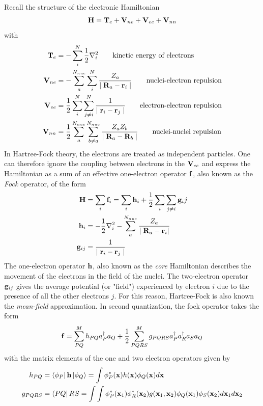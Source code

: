 Recall the structure of the electronic Hamiltonian
\begin{equation}
\mathbf{H} = \mathbf{T}_e + \mathbf{V}_{ne} + \mathbf{V}_{ee} + \mathbf{V}_{nn}
\end{equation}
\noindent with
\begin{align}
\mathbf{T}_e &= -\sum_i^N \frac{1}{2} \nabla_i^2 \qquad \textrm{kinetic energy of electrons} \\
\mathbf{V}_{ne} &= -\sum_a^{N_{nuc}} \sum_i^N \frac{Z_a}{\mid\mathbf{R}_a - \mathbf{r}_i\mid} \qquad \textrm{nuclei-electron repulsion} \\
\mathbf{V}_{ee} &= \frac{1}{2} \sum^N_i \sum^N_{j \neq i} \frac{1}{\mid \mathbf{r}_i - \mathbf{r}_j\mid} \qquad \textrm{electron-electron repulsion} \\
\mathbf{V}_{nn} &= \frac{1}{2}\sum_a^{N_{nuc}} \sum_{b \neq a}^{N_{nuc}} \frac{Z_a Z_b}{\mid \mathbf{R}_a - \mathbf{R}_b \mid} \qquad \textrm{nuclei-nuclei repulsion} 
\end{align}
\noindent In Hartree-Fock theory, the electrons are treated as independent particles. One can therefore ignore the coupling between electrons in the $\mathbf{V}_{ee}$ and express the Hamiltonian as a sum of an effective one-electron operator $\mathbf{f}$, also known as the \emph{Fock} operator, of the form
\begin{align}
\mathbf{H} &= \sum_i \mathbf{f}_i =  \sum_i \mathbf{h}_i + \frac{1}{2} \sum_i \sum_{j \neq i} \mathbf{g}_ij  \\
\mathbf{h}_i &= -\frac{1}{2}\nabla_i^2 - \sum_a^{N_{nuc}} \frac{Z_a}{\mid \mathbf{R}_a - \mathbf{r}_i |} \\
\mathbf{g}_{ij} &= \frac{1}{\mid \mathbf{r}_i - \mathbf{r}_j \mid}
\end{align}
\noindent The one-electron operator $\mathbf{h}$, also known as the \emph{core} Hamiltonian describes the movement of the electrons in the field of the nuclei. The two-electron operator $\mathbf{g}_{ij}$ gives the average potential (or "field") experienced by electron $i$ due to the presence of all the other electrons $j$. For this reason, Hartree-Fock is also known the \emph{mean-field} approximation. In second quantization, the fock operator takes the form
\begin{equation}
\mathbf{f} = \sum^{M}_{PQ} h_{PQ} a^{\dagger}_P a_Q + \frac{1}{2} \sum^{M}_{PQRS} g_{PQRS} a^{\dagger}_P a^{\dagger}_R a_S a_Q
\label{eq:FOCK2Q}
\end{equation}
\noindent with the matrix elements of the one and two electron operators given by
\begin{align}
h_{PQ} &= \bra{\phi_P} \mathbf{h} \ket{\phi_Q} = \int \phi_P^*(\mathbf{x}) h(\mathbf{x}) \phi_Q(\mathbf{x}) d\mathbf{x} \\
g_{PQRS} &= \bra{PQ}{RS} = \int\int \phi_P^*(\mathbf{x}_1) \phi^*_R(\mathbf{x}_2) g(\mathbf{x}_1,\mathbf{x}_2) \phi_Q(\mathbf{x}_1) \phi_S(\mathbf{x}_2) d\mathbf{x}_1 d\mathbf{x}_2
\end{align} 
